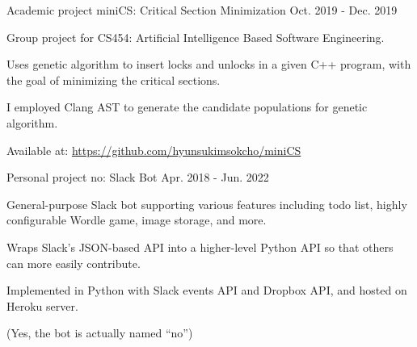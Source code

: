 

\begin{cventries}

  \cventry
    {Academic project} %
    {miniCS: Critical Section Minimization} %
    {} %
    {Oct. 2019 - Dec. 2019} %
    {
      \begin{cvitems} %
        \item {Group project for CS454: Artificial Intelligence Based Software Engineering.}
        \item {Uses genetic algorithm to insert locks and unlocks in a given C++ program, with the goal of minimizing the critical sections.}
        \item {I employed Clang AST to generate the candidate populations for genetic algorithm.}
        \item {Available at: \href{https://github.com/hyunsukimsokcho/miniCS}{https://github.com/hyunsukimsokcho/miniCS}}
      \end{cvitems}
    }

  \cventry
    {Personal project} %
    {no: Slack Bot} %
    {} %
    {Apr. 2018 - Jun. 2022} %
    {
      \begin{cvitems} %
        \item {General-purpose Slack bot supporting various features including todo list, highly configurable Wordle game, image storage, and more.}
        \item {Wraps Slack's JSON-based API into a higher-level Python API so that others can more easily contribute.}
        \item {Implemented in Python with Slack events API and Dropbox API, and hosted on Heroku server.}
        \item {(Yes, the bot is actually named ``no'')}
      \end{cvitems}
    }

\end{cventries}
